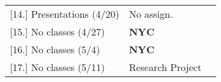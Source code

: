 \documentclass[article,oneside]{memoir}
\begin{document}
\begin{center}
\begin{longtable}{p{4.5cm}p{2cm}p{6.5cm}}
[14.] Presentations (4/20)			& No assign.			&  \\ [1.8\baselineskip]
												 
[15.] No classes (4/27)			& \textbf{NYC} & \\  [1.8\baselineskip]

[16.] No classes (5/4)			&  \textbf{NYC}	& \\ [1.8\baselineskip]
	
[17.] No classes (5/11)			& Research Project 	& \\ [1.8\baselineskip]

\end{longtable}
\end{center}
\end{document}
